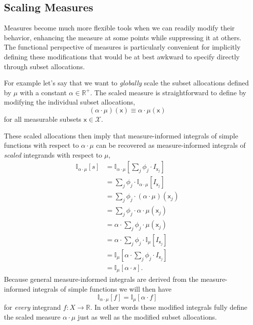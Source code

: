 \documentclass[
  letterpaper,
  DIV=11,
  numbers=noendperiod]{scrartcl}
\begin{document}
\hypertarget{sec:scaling_measures}{%
\subsection{Scaling Measures}\label{sec:scaling_measures}}

Measures become much more flexible tools when we can readily modify
their behavior, enhancing the measure at some points while suppressing
it at others. The functional perspective of measures is particularly
convenient for implicitly defining these modifications that would be at
best awkward to specify directly through subset allocations.

For example let's say that we want to \emph{globally} scale the subset
allocations defined by \(\mu\) with a constant
\(\alpha \in \mathbb{R}^{+}\). The scaled measure is straightforward to
define by modifying the individual subset allocations, \[
(\alpha \cdot \mu)(\mathsf{x}) \equiv \alpha \cdot \mu(\mathsf{x})
\] for all measurable subsets \(\mathsf{x} \in \mathcal{X}\).

These scaled allocations then imply that measure-informed integrals of
simple functions with respect to \(\alpha \cdot \mu\) can be recovered
as measure-informed integrals of \emph{scaled} integrands with respect
to \(\mu\), \begin{align*}
\mathbb{I}_{\alpha \cdot \mu} [ s ]
&=
\mathbb{I}_{\alpha \cdot \mu}
\left[ \sum_{j} \phi_{j} \cdot I_{\mathsf{x}_{j}} \right]
\\
&=
\sum_{j} \phi_{j} \cdot
\mathbb{I}_{\alpha \cdot \mu} [ I_{\mathsf{x}_{j}} ]
\\
&=
\sum_{j} \phi_{j} \cdot (\alpha \cdot \mu)(\mathsf{x}_{j})
\\
&=
\sum_{j} \phi_{j} \cdot \alpha \cdot \mu(\mathsf{x}_{j})
\\
&=
\alpha \cdot \sum_{j} \phi_{j} \cdot \mu(\mathsf{x}_{j})
\\
&=
\alpha \cdot \sum_{j} \phi_{j} \cdot
\mathbb{I}_{\mu}
[ I_{\mathsf{x}_{j}} ]
\\
&=
\mathbb{I}_{\mu}
\left[ \alpha \cdot \sum_{j} \phi_{j} \cdot I_{\mathsf{x}_{j}} \right]
\\
&=
\mathbb{I}_{\mu} [ \alpha \cdot s ].
\end{align*} Because general measure-informed integrals are derived from
the measure-informed integrals of simple functions we will then have \[
\mathbb{I}_{\alpha \cdot \mu} [ f ] = \mathbb{I}_{\mu} [ \alpha \cdot f ]
\] for \emph{every} integrand \(f: X \rightarrow \mathbb{R}\). In other
words these modified integrals fully define the scaled measure
\(\alpha \cdot \mu\) just as well as the modified subset allocations.
\end{document}
